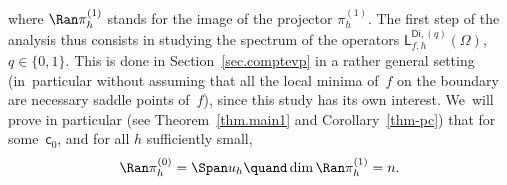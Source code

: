 where $\Ran \pi_h^{(1)}$ stands for the image of the projector $\pi_h^{(1)}$.
The first step of the analysis thus consists in studying the spectrum
of the operators $\mathsf
L^{\mathsf{Di},(q)}_{f,h}(\Omega)$, $q\in\{0,1\}$. This is done in
Section~\ref{sec.comptevp} in a rather general setting (in~particular
without assuming that all the local minima of~$f$ on the boundary are
necessary saddle points of~$f$), since this
study has its own interest. We~will prove in
particular
(see Theorem~\ref{thm.main1} and Corollary~\ref{thm-pc}) that for
some~$\mathsf
c_0$, and for all $h$ sufficiently small,\vspace*{-3pt}
\begin{equation}\label{eq.dim-no}
\Ran \pi_h^{(0)} = \Span u_h \quand \dim \Ran \pi_h^{(1)} =n.
\end{equation}


